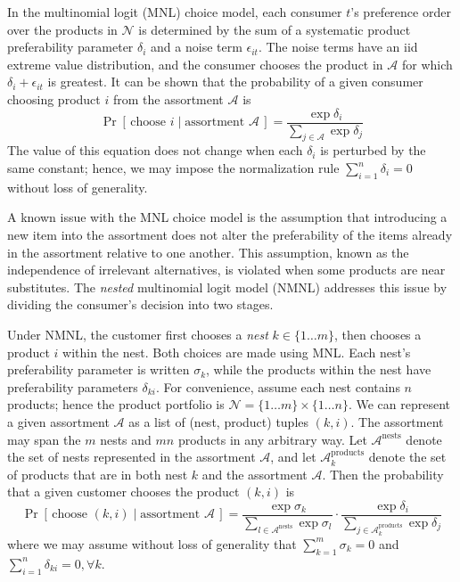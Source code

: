 \documentclass[preprint,12pt,authoryear]{elsarticle}
\begin{document}
In the multinomial logit (MNL) choice model, each consumer $t$'s preference order over the products in $\mathcal{N}$ is determined by the sum of a systematic product preferability parameter $\delta_i$ and a noise term $\epsilon_{it}$. The noise terms have an iid extreme value distribution, and the consumer chooses the product in $\mathcal{A}$ for which $\delta_i + \epsilon_{it}$ is greatest. It can be shown that the probability of a given consumer choosing product $i$ from the assortment $\mathcal{A}$ is
\begin{equation}\label{mnlchoiceprobability}
\operatorname{Pr}\left[\,\text{choose } i \;|\;\text{assortment }\mathcal{A}\,\right] =\frac{\exp \delta_i}{\sum_{j\in \mathcal{A}} \exp \delta_j}
\end{equation}
The value of this equation does not change when each $\delta_i$ is perturbed by the same constant; hence, we may impose the normalization rule $\sum_{i=1}^n \delta_i = 0$ without loss of generality. 

A known issue with the MNL choice model is the assumption that introducing a new item into the assortment does not alter the preferability of the items already in the assortment relative to one another. This assumption, known as the independence of irrelevant alternatives, is violated when some products are near substitutes. The \emph{nested} multinomial logit model (NMNL) addresses this issue by dividing the consumer’s decision into two stages. 

Under NMNL, the customer first chooses a \emph{nest} $k \in \{ 1 \dots m\}$, then chooses a product $i$ within the nest. Both choices are made using MNL. Each nest's preferability parameter is written $\sigma_k$, while the products within the nest have preferability parameters $\delta_{ki}$. For convenience, assume each nest contains $n$ products; hence the product portfolio is $\mathcal{N} = \{1\dots m\} \times \{1\dots n\}$. We can represent a given assortment $\mathcal{A}$ as a list of (nest, product) tuples $(k, i)$. The assortment may span the $m$ nests and $mn$ products in any arbitrary way. Let $\mathcal{A}^{\text{nests}}$ denote the set of nests represented in the assortment $\mathcal{A}$, and let $\mathcal{A}_k^{\text{products}}$ denote the set of products that are in both nest $k$ and the assortment $\mathcal{A}$. Then the probability that a given customer chooses the product $(k, i)$ is
\begin{equation}\label{nmnlchoiceprobability}
\operatorname{Pr}\left[\,\text{choose } (k, i) \;|\;\text{assortment }\mathcal{A}\,\right] =\frac{\exp \sigma_k}{\sum_{l\in \mathcal{A}^{\text{nests}}} \exp \sigma_l} \cdot \frac{\exp \delta_i}{\sum_{j\in\mathcal{A}_{k}^{\text{products}}} \exp \delta_j}\end{equation}
where we may assume without loss of generality that $\sum_{k=1}^m \sigma_k = 0$ and $\sum_{i=1}^n \delta_{ki} = 0, \forall k$. 
\end{document}
